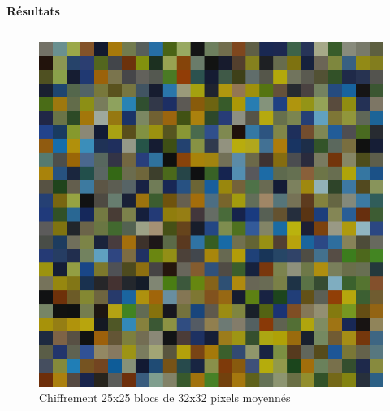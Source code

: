 \documentclass{beamer}
\begin{document}
\begin{frame}[t]
\begin{columns}[t]
\begin{column}{.5\linewidth}
\begin{block}{\centering \textbf{Résultats}}
\begin{columns}[t]
                        \begin{column}{.25\linewidth}
                            \begin{figure}[t]
                                \includegraphics[width=\linewidth]{rsc/van_gogh_a_25_12.png}\\
                                {\small Chiffrement 25x25 blocs de 32x32 pixels moyennés}
                            \end{figure}
                        \end{column}


\end{columns}
\end{block}
\end{column}
\end{columns}
\end{frame}
\end{document}
